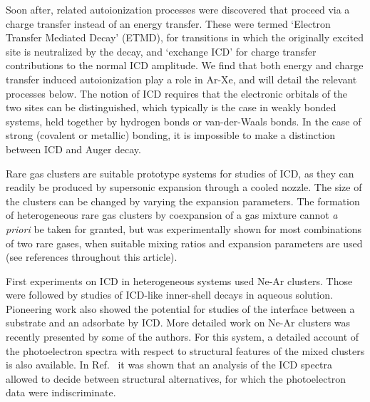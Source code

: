 Soon after, related 
autoionization processes were discovered that proceed via a 
charge transfer instead of an energy transfer. 
These were termed `Electron Transfer Mediated Decay' 
 (ETMD),\cite{zobeley,mueller,sakai,foerstel} for transitions in 
 which the originally excited site is neutralized by the decay, 
 and `exchange ICD' for charge transfer contributions to the 
 normal ICD amplitude.\cite{santrarev,jahnkesat}
We find that both energy and charge transfer induced 
autoionization play a role in Ar-Xe, and will detail the 
relevant processes below. The notion of ICD requires that the 
electronic orbitals of the two sites can be distinguished, which 
typically is the case in weakly bonded systems, held together by 
hydrogen bonds or van-der-Waals bonds. In the case of strong
(covalent or metallic) bonding, it is impossible to make a
distinction between ICD and Auger decay.\cite{hergenhahn_review}

Rare gas clusters are suitable prototype systems for studies of
ICD, as they can readily be produced by supersonic 
expansion through a cooled nozzle. 
The size of the clusters can be changed by varying the expansion parameters.
The formation of heterogeneous rare gas clusters by coexpansion of a gas mixture cannot {\it a priori} be taken for granted, but was experimentally shown for most combinations of two rare gases, when suitable mixing ratios and expansion parameters are used (see references throughout this article).

First experiments on ICD in heterogeneous systems used Ne-Ar 
clusters.\cite{barthnear} Those were followed by studies of 
ICD-like inner-shell decays in aqueous solution.\cite{aziz,pokapanich,pokapanich2011}
Pioneering work also showed the 
potential for studies of the interface between a substrate and an 
adsorbate by ICD.\cite{grieves} More detailed work on Ne-Ar 
clusters was recently presented by some of the authors.\cite{
fasshauer2014} For this system, a detailed account of the
photoelectron spectra with respect to structural features of the 
mixed clusters is also available.\cite{lundwall} In Ref.\  it was shown that an analysis of the ICD spectra 
allowed to decide between structural alternatives, for which the 
photoelectron data were indiscriminate.

